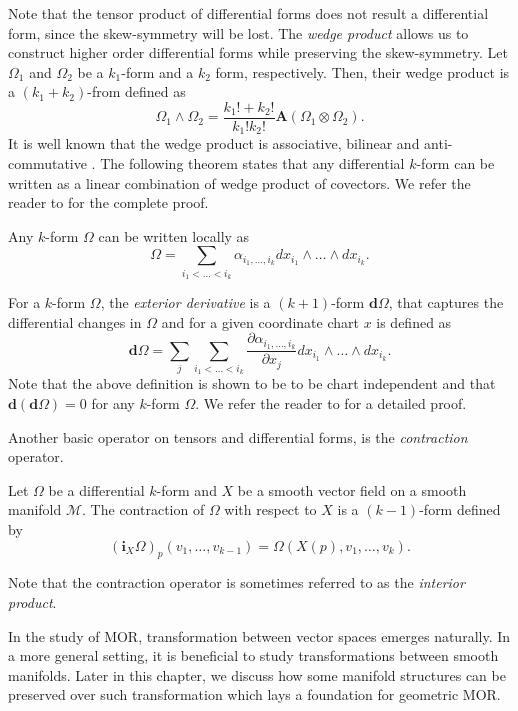 Note that the tensor product of differential forms does not result a differential form, since the skew-symmetry will be lost. The \emph{wedge product} allows us to construct higher order differential forms while preserving the skew-symmetry. Let $\Omega_1$ and $\Omega_2$ be a $k_1$-form and a $k_2$ form, respectively. Then, their wedge product is a $(k_1+k_2)$-from defined as
\begin{equation}
	\Omega_1 \wedge \Omega_2 = \frac{k_1! + k_2!}{k_1!k_2!} \mathbf{A}(\Omega_1\otimes \Omega_2).
\end{equation}
It is well known that the wedge product is associative, bilinear and anti-commutative \cite{marsden2013introduction}. The following theorem states that any differential $k$-form can be written as a linear combination of wedge product of covectors. We refer the reader to \cite{} for the complete proof.
\begin{theorem}
Any $k$-form $\Omega$ can be written locally as
\begin{equation}
	\Omega = \sum_{i_1<\dots<i_k} \alpha_{i_1,\dots,i_k} dx_{i_1}\wedge\dots\wedge dx_{i_k}.
\end{equation}
\end{theorem}

For a $k$-form $\Omega$, the \emph{exterior derivative} is a $(k+1)$-form $\mathbf d \Omega$, that captures the differential changes in $\Omega$ and for a given coordinate chart $x$ is defined as
\begin{equation}
	\mathbf d \Omega =  \sum_j \sum_{i_1<\dots<i_k} \frac{\partial \alpha_{i_1,\dots,i_k}}{\partial x_j} dx_{i_1}\wedge\dots\wedge dx_{i_k}.
\end{equation}
Note that the above definition is shown to be to be chart independent and that $\mathbf d (\mathbf d \Omega) = 0$ for any $k$-form $\Omega$. We refer the reader to \cite{} for a detailed proof.

Another basic operator on tensors and differential forms, is the \emph{contraction} operator.
\begin{definition}
	Let $\Omega$ be a differential $k$-form and $X$ be a smooth vector field on a smooth manifold $\mathcal M$. The contraction of $\Omega$ with respect to $X$ is a $(k-1)$-form defined by
\[
	(\mathbf i_{X}\Omega)_p(v_1,\dots,v_{k-1}) = \Omega(X(p),v_1,\dots,v_k).
\]
\end{definition}
Note that the contraction operator is sometimes referred to as the \emph{interior product}.

In the study of MOR, transformation between vector spaces emerges naturally. In a more general setting, it is beneficial to study transformations between smooth manifolds. Later in this chapter, we discuss how some manifold structures can be preserved over such transformation which lays a foundation for geometric MOR.

